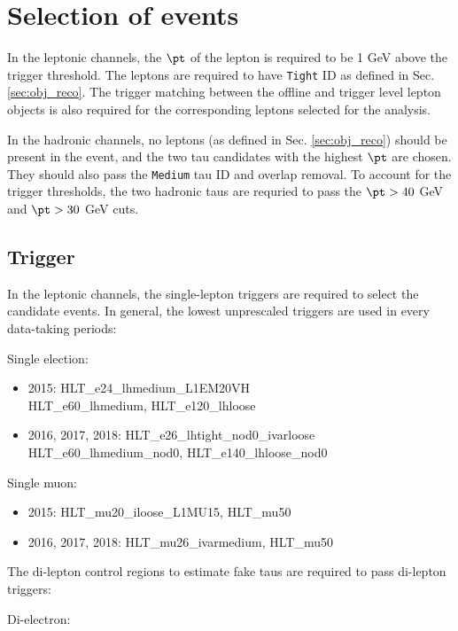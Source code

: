 \section{Selection of events}
\label{sec:selection}

In the leptonic channels, the $\pt$ of the lepton is required to be 1 GeV above the trigger threshold. The leptons are required to have \texttt{Tight} ID as defined in Sec. \ref{sec:obj_reco}. The trigger matching between the offline and trigger level lepton objects is also required for the corresponding leptons selected for the analysis.

In the hadronic channels, no leptons (as defined in Sec. \ref{sec:obj_reco}) should be present in the event, and the two tau candidates with the highest $\pt$ are chosen. They should also pass the \texttt{Medium} tau ID and overlap removal. To account for the trigger thresholds, the two hadronic taus are requried to pass the $\pt>40$ GeV and $\pt>30$ GeV cuts.

\subsection{Trigger}
\label{sec:trigger}

In the leptonic channels, the single-lepton triggers are required to select the candidate events. In general, the lowest unprescaled triggers are used in every data-taking periods:

Single election:

\begin{itemize}
\item 2015: HLT\_e24\_lhmedium\_L1EM20VH\\
HLT\_e60\_lhmedium, HLT\_e120\_lhloose
\item 2016, 2017, 2018: HLT\_e26\_lhtight\_nod0\_ivarloose\\
HLT\_e60\_lhmedium\_nod0, HLT\_e140\_lhloose\_nod0
\end{itemize}

Single muon:

\begin{itemize}
\item 2015: HLT\_mu20\_iloose\_L1MU15, HLT\_mu50
\item 2016, 2017, 2018: HLT\_mu26\_ivarmedium, HLT\_mu50
\end{itemize}

The di-lepton control regions to estimate fake taus are required to pass di-lepton triggers:

Di-electron:

